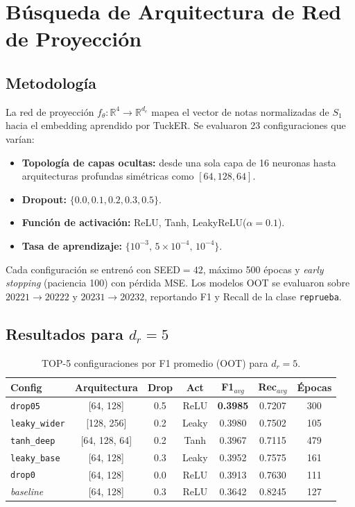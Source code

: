 \documentclass[11pt,a4paper]{article}
\begin{document}
\section{Búsqueda de Arquitectura de Red de Proyección}

\subsection{Metodología}

La red de proyección $f_\theta:\mathbb{R}^4 \to \mathbb{R}^{d_e}$ mapea el vector de notas
normalizadas de $S_1$ hacia el embedding aprendido por TuckER.  Se evaluaron 23
configuraciones que varían:

\begin{itemize}
    \item \textbf{Topología de capas ocultas:} desde una sola capa de 16 neuronas hasta
    arquitecturas profundas simétricas como $[64, 128, 64]$.
    \item \textbf{Dropout:} $\{0.0, 0.1, 0.2, 0.3, 0.5\}$.
    \item \textbf{Función de activación:} ReLU, Tanh, LeakyReLU($\alpha=0.1$).
    \item \textbf{Tasa de aprendizaje:} $\{10^{-3},\,5 \times 10^{-4},\,10^{-4}\}$.
\end{itemize}

Cada configuración se entrenó con SEED$=42$, máximo 500 épocas y \emph{early stopping}
(paciencia 100) con pérdida MSE. Los modelos OOT se evaluaron sobre
$20221 \to 20222$ y $20231 \to 20232$, reportando F1 y Recall de la clase
\texttt{reprueba}.

\subsection{Resultados para $d_r = 5$}

\begin{table}[H]
\centering
\caption{TOP-5 configuraciones por F1 promedio (OOT) para $d_r=5$.}
\label{tab:top5_f1_rdim5}
\begin{tabular}{lcccccc}
\toprule
\textbf{Config} & \textbf{Arquitectura} & \textbf{Drop} & \textbf{Act} & \textbf{F1$_{avg}$} & \textbf{Rec$_{avg}$} & \textbf{Épocas} \\
\midrule
\texttt{drop05}      & [64, 128]    & 0.5 & ReLU   & \textbf{0.3985} & 0.7207 & 300 \\
\texttt{leaky\_wider} & [128, 256]  & 0.2 & Leaky  & 0.3980 & 0.7502 & 105 \\
\texttt{tanh\_deep}  & [64, 128, 64] & 0.2 & Tanh  & 0.3967 & 0.7115 & 479 \\
\texttt{leaky\_base} & [64, 128]   & 0.3 & Leaky  & 0.3952 & 0.7575 & 161 \\
\texttt{drop0}       & [64, 128]   & 0.0 & ReLU   & 0.3913 & 0.7630 & 111 \\
\midrule
\textit{baseline}    & [64, 128]   & 0.3 & ReLU   & 0.3642 & 0.8245 & 127 \\
\bottomrule
\end{tabular}
\end{table}
\end{document}
